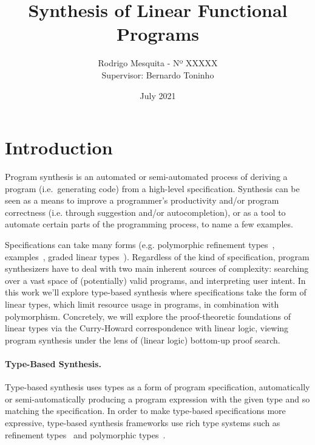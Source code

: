 \documentclass{llncs}
\title{Synthesis of Linear Functional Programs}
\author{Rodrigo Mesquita - Nº XXXXX \\
    Supervisor: Bernardo Toninho}
\date{July 2021}
\institute{NOVA School of Science and Technology}
\newcommand{\mypara}[1]{\paragraph{\textbf{#1}.}}
\begin{document}
\maketitle

\section{Introduction}

Program synthesis is an automated or semi-automated process of deriving a
program (i.e.~generating code) from a high-level specification.
%
Synthesis can be seen as a means to improve a programmer's productivity and/or
program correctness (i.e. through suggestion and/or autocompletion), or as a
tool to automate certain parts of the programming process, to name a few
examples.

Specifications can take many forms (e.g.  polymorphic refinement
types~\cite{DBLP:conf/pldi/PolikarpovaKS16},
examples~\cite{DBLP:conf/popl/FrankleOWZ16}, graded linear
types~\cite{DBLP:conf/lopstr/HughesO20}).  Regardless of the kind of
specification, program synthesizers have to deal with two main inherent sources
of complexity: searching over a vast space of (potentially) valid programs, and
interpreting user intent.
%
In this work we'll explore type-based synthesis where specifications take the
form of linear types, which limit resource usage in programs, in combination
with polymorphism.  Concretely, we will explore the proof-theoretic foundations
of linear types via the Curry-Howard correspondence with linear logic, viewing
program synthesis under the lens of (linear logic) bottom-up proof search.

%

\mypara{Type-Based Synthesis}
Type-based synthesis uses types as a form of program specification,
automatically or semi-automatically producing a program expression
with the given type and so matching the specification.
%
In order to make type-based specifications more expressive, type-based
synthesis frameworks use rich type systems such as refinement
types~\cite{DBLP:conf/pldi/PolikarpovaKS16} and polymorphic types~\cite{DBLP:conf/pldi/PolikarpovaKS16}.
\end{document}
